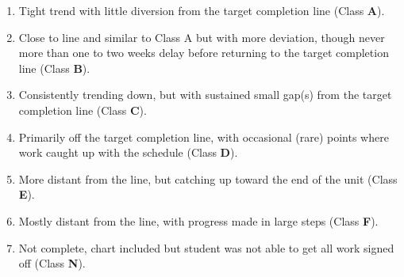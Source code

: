 \begin{enumerate}
  \item Tight trend with little diversion from the target completion line (Class \textbf{A}).
  \item Close to line and similar to Class A but with more deviation, though never more than one to two weeks delay before returning to the target completion line (Class \textbf{B}).
  \item Consistently trending down, but with sustained small gap(s) from the target completion line (Class \textbf{C}).
  \item Primarily off the target completion line, with occasional (rare) points where work caught up with the schedule (Class \textbf{D}). 
  \item More distant from the line, but catching up toward the end of the unit (Class \textbf{E}).
  \item Mostly distant from the line, with progress made in large steps (Class \textbf{F}).
  \item Not complete, chart included but student was not able to get all work signed off (Class \textbf{N}).
\end{enumerate}

